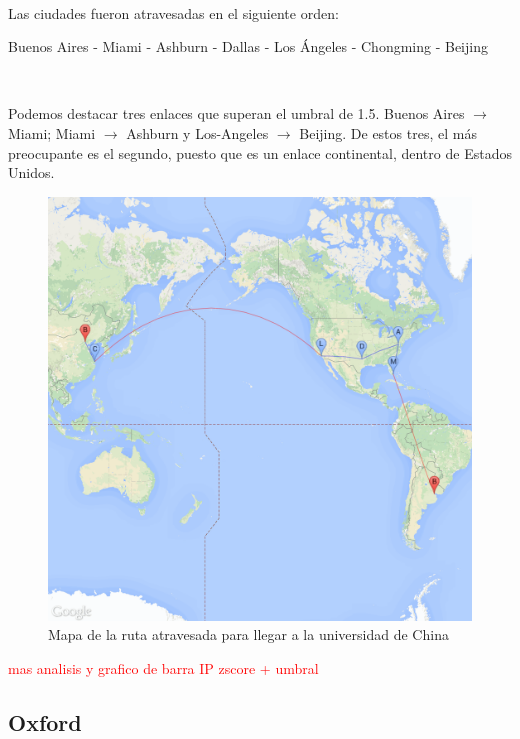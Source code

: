 ~

Las ciudades fueron atravesadas en el siguiente orden:

Buenos Aires - Miami - Ashburn - Dallas - Los \'Angeles - Chongming - Beijing

~

Podemos destacar tres enlaces que superan el umbral de 1.5. Buenos Aires $\rightarrow$ Miami; Miami $\rightarrow$ Ashburn y Los-Angeles $\rightarrow$ Beijing.
De estos tres, el m\'as preocupante es el segundo, puesto que es un enlace continental, dentro de Estados Unidos.

\begin{figure}[H]
	\begin{center}
		  \includegraphics[scale=0.25]{../results/maps/Tsinghua.png}
		  \caption{Mapa de la ruta atravesada para llegar a la universidad de China}
	\end{center}
\end{figure}

\textcolor{red}{mas analisis y grafico de barra IP zscore + umbral}

\subsection{Oxford}

~

